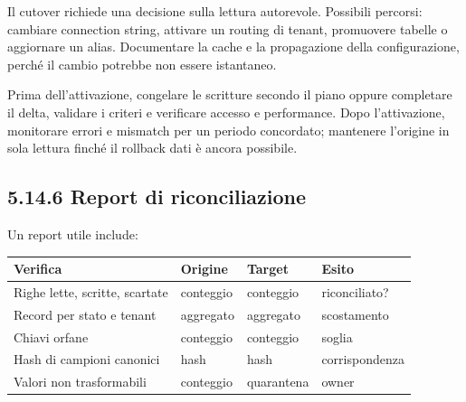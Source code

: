 \documentclass[
  italian,
  10pt,
]{book}
\newcounter{none} %
\begin{document}
Il cutover richiede una decisione sulla lettura autorevole. Possibili
percorsi: cambiare connection string, attivare un routing di tenant,
promuovere tabelle o aggiornare un alias. Documentare la cache e la
propagazione della configurazione, perché il cambio potrebbe non essere
istantaneo.

Prima dell'attivazione, congelare le scritture secondo il piano oppure
completare il delta, validare i criteri e verificare accesso e
performance. Dopo l'attivazione, monitorare errori e mismatch per un
periodo concordato; mantenere l'origine in sola lettura finché il
rollback dati è ancora possibile.

\subsection{5.14.6 Report di
riconciliazione}\label{report-di-riconciliazione}

Un report utile include:

{\def\LTcaptype{none} %
\begin{longtable}[]{@{}
  >{\raggedright\arraybackslash}p{}
  >{\raggedleft\arraybackslash}p{}
  >{\raggedleft\arraybackslash}p{}
  >{\raggedright\arraybackslash}p{}@{}}
\toprule\noalign{}
\begin{minipage}[b]{\linewidth}\raggedright
Verifica
\end{minipage} & \begin{minipage}[b]{\linewidth}\raggedleft
Origine
\end{minipage} & \begin{minipage}[b]{\linewidth}\raggedleft
Target
\end{minipage} & \begin{minipage}[b]{\linewidth}\raggedright
Esito
\end{minipage} \\
\midrule\noalign{}
\endhead
\bottomrule\noalign{}
\endlastfoot
Righe lette, scritte, scartate & conteggio & conteggio &
riconciliato? \\
Record per stato e tenant & aggregato & aggregato & scostamento \\
Chiavi orfane & conteggio & conteggio & soglia \\
Hash di campioni canonici & hash & hash & corrispondenza \\
Valori non trasformabili & conteggio & quarantena & owner \\
\end{longtable}
}
\end{document}
